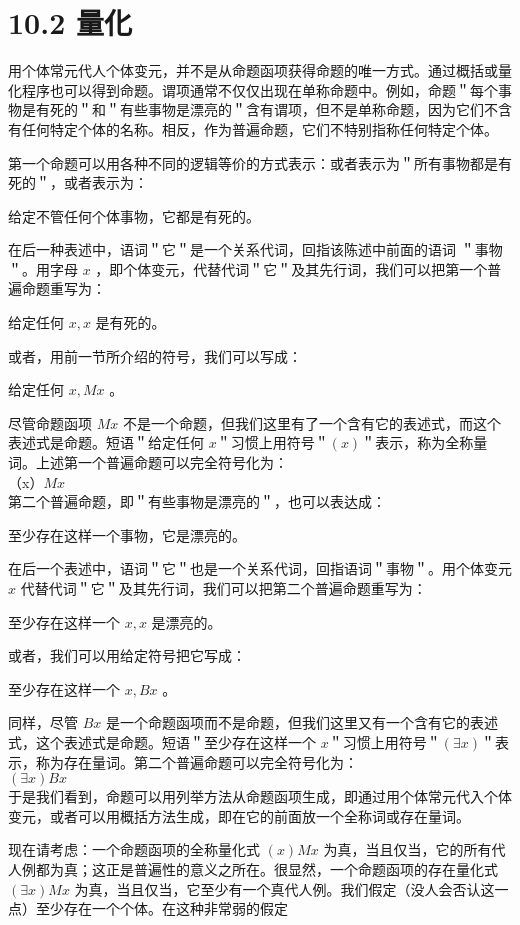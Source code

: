 \section*{10.2 量化}
用个体常元代人个体变元，并不是从命题函项获得命题的唯一方式。通过概括或量化程序也可以得到命题。谓项通常不仅仅出现在单称命题中。例如，命题＂每个事物是有死的＂和＂有些事物是漂亮的＂含有谓项，但不是单称命题，因为它们不含有任何特定个体的名称。相反，作为普遍命题，它们不特别指称任何特定个体。

第一个命题可以用各种不同的逻辑等价的方式表示：或者表示为＂所有事物都是有死的＂，或者表示为：

给定不管任何个体事物，它都是有死的。

在后一种表述中，语词＂它＂是一个关系代词，回指该陈述中前面的语词 ＂事物＂。用字母 $x$ ，即个体变元，代替代词＂它＂及其先行词，我们可以把第一个普遍命题重写为：

给定任何 $x, x$ 是有死的。

或者，用前一节所介绍的符号，我们可以写成：

给定任何 $x, M x$ 。

尽管命题函项 $M x$ 不是一个命题，但我们这里有了一个含有它的表述式，而这个表述式是命题。短语＂给定任何 $x$＂习惯上用符号＂$(x)$＂表示，称为全称量词。上述第一个普遍命题可以完全符号化为：\\
（x）$M x$\\
第二个普遍命题，即＂有些事物是漂亮的＂，也可以表达成：

至少存在这样一个事物，它是漂亮的。

在后一个表述中，语词＂它＂也是一个关系代词，回指语词＂事物＂。用个体变元 $x$ 代替代词＂它＂及其先行词，我们可以把第二个普遍命题重写为：

至少存在这样一个 $x, x$ 是漂亮的。

或者，我们可以用给定符号把它写成：

至少存在这样一个 $x, B x$ 。

同样，尽管 $B x$ 是一个命题函项而不是命题，但我们这里又有一个含有它的表述式，这个表述式是命题。短语＂至少存在这样一个 $x$＂习惯上用符号＂$(\exists x)$＂表示，称为存在量词。第二个普遍命题可以完全符号化为：\\
$(\exists x) B x$\\
于是我们看到，命题可以用列举方法从命题函项生成，即通过用个体常元代入个体变元，或者可以用概括方法生成，即在它的前面放一个全称词或存在量词。

现在请考虑：一个命题函项的全称量化式 $(x) M x$ 为真，当且仅当，它的所有代人例都为真；这正是普遍性的意义之所在。很显然，一个命题函项的存在量化式 $(\exists x) M x$ 为真，当且仅当，它至少有一个真代人例。我们假定（没人会否认这一点）至少存在一个个体。在这种非常弱的假定

